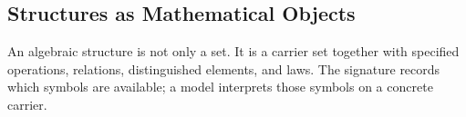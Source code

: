 \subsection*{Structures as Mathematical Objects}
\label{subsec:structures-as-mathematical-objects}

\begin{remark*}[Exposition]
An algebraic structure is not only a set.  It is a carrier set together with
specified operations, relations, distinguished elements, and laws.  The
signature records which symbols are available; a model interprets those symbols
on a concrete carrier.
\end{remark*}

